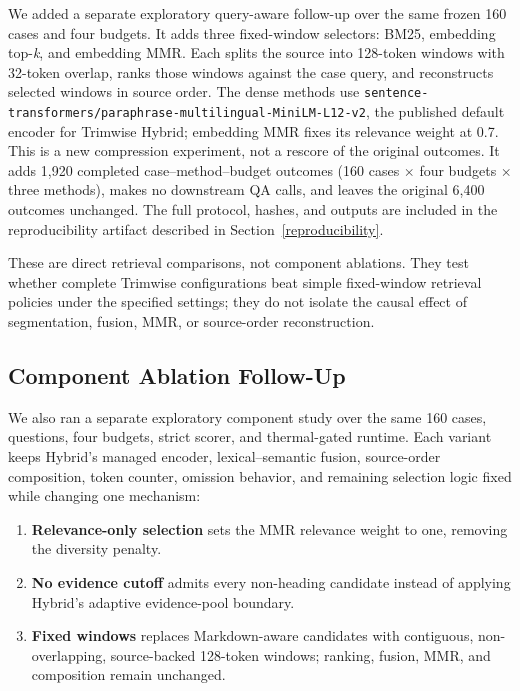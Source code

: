 \documentclass[
]{article}
\providecommand{\tightlist}{%
  \setlength{\itemsep}{0pt}\setlength{\parskip}{0pt}}
\begin{document}
We added a separate exploratory query-aware follow-up over the same frozen
160 cases and four budgets.
It adds three fixed-window selectors: BM25, embedding top-\emph{k}, and
embedding MMR. Each splits the source into 128-token windows with 32-token
overlap, ranks those windows against the case query, and reconstructs selected
windows in source order. The dense methods use
\texttt{sentence-transformers/paraphrase-multilingual-MiniLM-L12-v2}, the
published default encoder for Trimwise Hybrid; embedding MMR fixes its relevance
weight at 0.7. This is a new compression experiment, not a rescore of the
original outcomes. It adds 1,920 completed case--method--budget outcomes
(160 cases $\times$ four budgets $\times$ three methods), makes no downstream
QA calls, and leaves the original 6,400 outcomes unchanged. The full protocol,
hashes, and outputs are included in the reproducibility artifact described in
Section~\ref{reproducibility}.

These are direct retrieval comparisons, not component ablations. They test
whether complete Trimwise configurations beat simple fixed-window retrieval
policies under the specified settings; they do not isolate the causal effect of
segmentation, fusion, MMR, or source-order reconstruction.

\subsection{Component Ablation Follow-Up}\label{component-ablation-follow-up}

We also ran a separate exploratory component study over the same 160 cases,
questions, four budgets, strict scorer, and thermal-gated runtime. Each variant
keeps Hybrid's managed encoder, lexical--semantic fusion, source-order
composition, token counter, omission behavior, and remaining selection logic
fixed while changing one mechanism:

\begin{enumerate}
\tightlist
\item
  \textbf{Relevance-only selection} sets the MMR relevance weight to one,
  removing the diversity penalty.
\item
  \textbf{No evidence cutoff} admits every non-heading candidate instead of
  applying Hybrid's adaptive evidence-pool boundary.
\item
  \textbf{Fixed windows} replaces Markdown-aware candidates with contiguous,
  non-overlapping, source-backed 128-token windows; ranking, fusion, MMR, and
  composition remain unchanged.
\end{enumerate}
\end{document}
